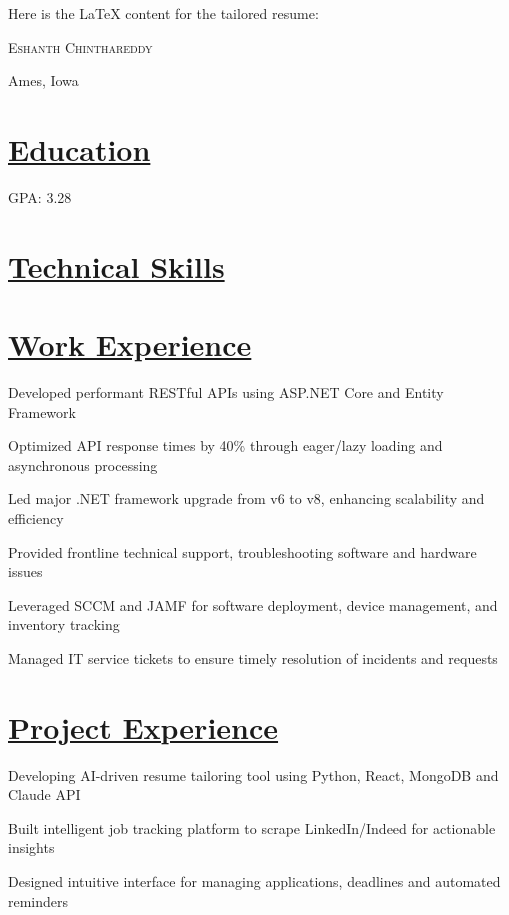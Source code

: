 \documentclass[letterpaper,11pt]{article}
\newcommand{\name}[1]{\centerline{\Huge \scshape #1}\vspace{1.25ex}}
\newcommand{\address}[1]{\centerline{#1}\vspace{-7pt}}
\begin{document}
Here is the LaTeX content for the tailored resume:

\name{Eshanth Chinthareddy}
\address{Ames, Iowa}

\section{\underline{Education}}
\item GPA: 3.28

\section{\underline{Technical Skills}}

\section{\underline{Work Experience}}
\item Developed performant RESTful APIs using ASP.NET Core and Entity Framework
\item Optimized API response times by 40\% through eager/lazy loading and asynchronous processing
\item Led major .NET framework upgrade from v6 to v8, enhancing scalability and efficiency

\item Provided frontline technical support, troubleshooting software and hardware issues
\item Leveraged SCCM and JAMF for software deployment, device management, and inventory tracking
\item Managed IT service tickets to ensure timely resolution of incidents and requests

\section{\underline{Project Experience}}
\item Developing AI-driven resume tailoring tool using Python, React, MongoDB and Claude API  
\item Built intelligent job tracking platform to scrape LinkedIn/Indeed for actionable insights
\item Designed intuitive interface for managing applications, deadlines and automated reminders
\end{document}
